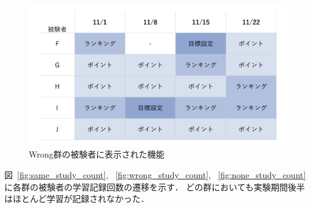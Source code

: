 \begin{figure}[h]
  \begin{center}
  \includegraphics[width=12cm]{images/7/wrong_feature.png}
  \caption{Wrong群の被験者に表示された機能}
  \label{fig:wrong_feature}
  \end{center}
\end{figure}

図~\ref{fig:same_study_count}, ~\ref{fig:wrong_study_count}, ~\ref{fig:none_study_count}に各群の被験者の学習記録回数の遷移を示す．
どの群においても実験期間後半はほとんど学習が記録されなかった．

